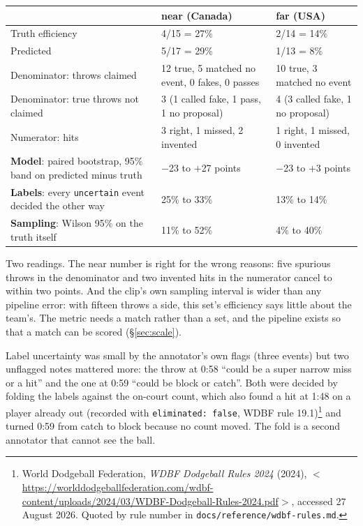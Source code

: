 \documentclass[10pt,a4paper]{article}
\begin{document}
{\footnotesize
\begin{xltabular}{\textwidth}{L{58mm} X X}
\toprule
 & \textbf{near (Canada)} & \textbf{far (USA)}\\
\midrule
Truth efficiency & 4/15 = 27\% & 2/14 = 14\%\\
Predicted & 5/17 = 29\% & 1/13 = 8\%\\
Denominator: throws claimed & 12 true, 5 matched no event, 0 fakes, 0 passes & 10 true, 3 matched no event\\
Denominator: true throws not claimed & 3 (1 called fake, 1 pass, 1 no proposal) & 4 (3 called fake, 1 no proposal)\\
Numerator: hits & 3 right, 1 missed, 2 invented & 1 right, 1 missed, 0 invented\\
\textbf{Model}: paired bootstrap, 95\% band on predicted minus truth & $-$23 to $+$27 points & $-$23 to $+$3 points\\
\textbf{Labels}: every \texttt{uncertain} event decided the other way & 25\% to 33\% & 13\% to 14\%\\
\textbf{Sampling}: Wilson 95\% on the truth itself & 11\% to 52\% & 4\% to 40\%\\
\bottomrule
\end{xltabular}}

Two readings. The near number is right for the wrong reasons: five spurious throws in the
denominator and two invented hits in the numerator cancel to within two points. And the
clip's own sampling interval is wider than any pipeline error: with fifteen throws a side,
this set's efficiency says little about the team's. The metric needs a match rather than a
set, and the pipeline exists so that a match can be scored (\S\ref{sec:scale}).

Label uncertainty was small by the annotator's own flags (three events) but two unflagged
notes mattered more: the throw at 0:58 ``could be a super narrow miss or a hit'' and the
one at 0:59 ``could be block or catch''. Both were decided by folding the labels against
the on-court count, which also found a hit at 1:48 on a player already out (recorded with
\texttt{eliminated: false}, WDBF rule 19.1)\footnote{World Dodgeball Federation, \emph{WDBF
Dodgeball Rules 2024} (2024),
$<$\url{https://worlddodgeballfederation.com/wdbf-content/uploads/2024/03/WDBF-Dodgeball-Rules-2024.pdf}$>$,
accessed 27 August 2026. Quoted by rule number in \texttt{docs/reference/wdbf-rules.md}.}
and turned 0:59 from catch to block because no count moved. The fold is a second annotator
that cannot see the ball.
\end{document}

